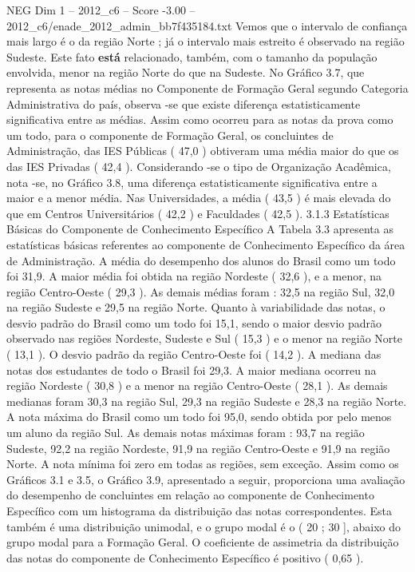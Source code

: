 \begin{textsample}{NEG Dim 1 – 2012\_c6 – Score -3.00 – 2012\_c6/enade\_2012\_admin\_bb7f435184.txt}
Vemos que o intervalo de confiança mais largo é o da região Norte ; já o intervalo mais estreito é observado na região Sudeste.
Este fato \textbf{está} relacionado, também, com o tamanho da população envolvida, menor na região Norte do que na Sudeste.
No Gráfico 3.7, que representa as notas médias no Componente de Formação Geral segundo Categoria Administrativa do país, observa -se que existe diferença estatisticamente significativa entre as médias.
Assim como ocorreu para as notas da prova como um todo, para o componente de Formação Geral, os concluintes de Administração, das IES Públicas ( 47,0 ) obtiveram uma média maior do que os das IES Privadas ( 42,4 ).
Considerando -se o tipo de Organização Acadêmica, nota -se, no Gráfico 3.8, uma diferença estatisticamente significativa entre a maior e a menor média.
Nas Universidades, a média ( 43,5 ) é mais elevada do que em Centros Universitários ( 42,2 ) e Faculdades ( 42,5 ). 3.1.3 Estatísticas Básicas do Componente de Conhecimento Específico A Tabela 3.3 apresenta as estatísticas básicas referentes ao componente de Conhecimento Específico da área de Administração.
A média do desempenho dos alunos do Brasil como um todo foi 31,9.
A maior média foi obtida na região Nordeste ( 32,6 ), e a menor, na região Centro-Oeste ( 29,3 ).
As demais médias foram : 32,5 na região Sul, 32,0 na região Sudeste e 29,5 na região Norte.
Quanto à variabilidade das notas, o desvio padrão do Brasil como um todo foi 15,1, sendo o maior desvio padrão observado nas regiões Nordeste, Sudeste e Sul ( 15,3 ) e o menor na região Norte ( 13,1 ).
O desvio padrão da região Centro-Oeste foi ( 14,2 ).
A mediana das notas dos estudantes de todo o Brasil foi 29,3.
A maior mediana ocorreu na região Nordeste ( 30,8 ) e a menor na região Centro-Oeste ( 28,1 ).
As demais medianas foram 30,3 na região Sul, 29,3 na região Sudeste e 28,3 na região Norte.
A nota máxima do Brasil como um todo foi 95,0, sendo obtida por pelo menos um aluno da região Sul.
As demais notas máximas foram : 93,7 na região Sudeste, 92,2 na região Nordeste, 91,9 na região Centro-Oeste e 91,9 na região Norte.
A nota mínima foi zero em todas as regiões, sem exceção.
Assim como os Gráficos 3.1 e 3.5, o Gráfico 3.9, apresentado a seguir, proporciona uma avaliação do desempenho de concluintes em relação ao componente de Conhecimento Específico com um histograma da distribuição das notas correspondentes.
Esta também é uma distribuição unimodal, e o grupo modal é o ( 20 ; 30 ], abaixo do grupo modal para a Formação Geral.
O coeficiente de assimetria da distribuição das notas do componente de Conhecimento Específico é positivo ( 0,65 ).

\end{textsample}

